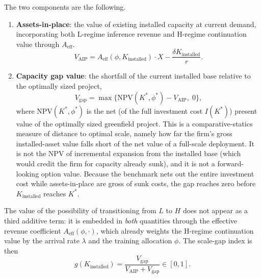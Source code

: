 \documentclass[
  11pt,
  letterpaper,
]{scrartcl}
\begin{document}
The two components are the following.

\begin{enumerate}
\def\labelenumi{\arabic{enumi}.}
\item
  \textbf{Assets-in-place}: the value of existing installed capacity at
  current demand, incorporating both L-regime inference revenue and
  H-regime continuation value through \(A_{\text{eff}}\). \[
  V_{\text{AIP}} = A_{\text{eff}}(\phi, K_{\text{installed}}) \cdot X - \frac{\delta K_{\text{installed}}}{r}.
  \]
\item
  \textbf{Capacity gap value}: the shortfall of the current installed
  base relative to the optimally sized project, \[
  V_{\text{gap}} = \max\{\text{NPV}(K^*, \phi^*) - V_{\text{AIP}},\; 0\},
  \] where \(\text{NPV}(K^*, \phi^*)\) is the net (of the full
  investment cost \(I(K^*)\)) present value of the optimally sized
  greenfield project. This is a comparative-statics measure of distance
  to optimal scale, namely how far the firm's gross installed-asset
  value falls short of the net value of a full-scale deployment. It is
  not the NPV of incremental expansion from the installed base (which
  would credit the firm for capacity already sunk), and it is not a
  forward-looking option value. Because the benchmark nets out the
  entire investment cost while assets-in-place are gross of sunk costs,
  the gap reaches zero before \(K_{\text{installed}}\) reaches \(K^*\).
\end{enumerate}

The value of the possibility of transitioning from \(L\) to \(H\) does
not appear as a third additive term: it is embedded in \emph{both}
quantities through the effective revenue coefficient
\(A_{\text{eff}}(\phi, \cdot)\), which already weights the H-regime
continuation value by the arrival rate \(\lambda\) and the training
allocation \(\phi\). The scale-gap index is then \[
g(K_{\text{installed}}) = \frac{V_{\text{gap}}}{V_{\text{AIP}} + V_{\text{gap}}} \in [0, 1].
\]
\end{document}
